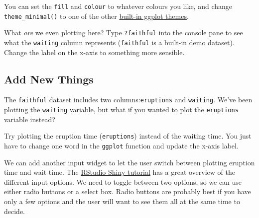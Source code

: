 \documentclass[
]{book}
\newenvironment{Shaded}{\begin{snugshade}}{\end{snugshade}}
\newcommand{\AttributeTok}[1]{\textcolor[rgb]{0.77,0.63,0.00}{#1}}
\newcommand{\CommentTok}[1]{\textcolor[rgb]{0.56,0.35,0.01}{\textit{#1}}}
\newcommand{\FunctionTok}[1]{\textcolor[rgb]{0.00,0.00,0.00}{#1}}
\newcommand{\NormalTok}[1]{#1}
\newcommand{\OtherTok}[1]{\textcolor[rgb]{0.56,0.35,0.01}{#1}}
\newcommand{\SpecialCharTok}[1]{\textcolor[rgb]{0.00,0.00,0.00}{#1}}
\newcommand{\StringTok}[1]{\textcolor[rgb]{0.31,0.60,0.02}{#1}}
\begin{document}
\begin{Shaded}
\end{Shaded}

You can set the \texttt{fill} and \texttt{colour} to whatever colours you like, and change \texttt{theme\_minimal()} to one of the other \href{https://ggplot2.tidyverse.org/reference/ggtheme.html\#examples}{built-in ggplot themes}.

What \emph{are} we even plotting here? Type \texttt{?faithful} into the console pane to see what the \texttt{waiting} column represents (\texttt{faithful} is a built-in demo dataset). Change the label on the x-axis to something more sensible.

\hypertarget{add-new-things}{%
\subsection{Add New Things}\label{add-new-things}}

The \texttt{faithful} dataset includes two columns:\texttt{eruptions} and \texttt{waiting}. We've been plotting the \texttt{waiting} variable, but what if you wanted to plot the \texttt{eruptions} variable instead?

Try plotting the eruption time (\texttt{eruptions}) instead of the waiting time. You just have to change one word in the \texttt{ggplot} function and update the x-axis label.

We can add another input widget to let the user switch between plotting eruption time and wait time. The \href{https://shiny.rstudio.com/tutorial/written-tutorial/lesson3/}{RStudio Shiny tutorial} has a great overview of the different input options. We need to toggle between two options, so we can use either radio buttons or a select box. Radio buttons are probably best if you have only a few options and the user will want to see them all at the same time to decide.
\end{document}
